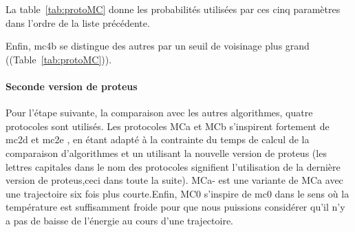La table~\ref{tab:protoMC} donne les probabilités utilisées par ces cinq paramètres dans l'ordre de la liste précédente. 

 Enfin, mc4b se distingue des autres par un seuil de voisinage plus grand ((Table~\ref{tab:protoMC})).


\paragraph{Seconde version de proteus}
Pour l'étape suivante, la comparaison avec les autres algorithmes, quatre protocoles sont utilisés. Les protocoles MCa et MCb s'inspirent fortement de mc2d et mc2e , en étant adapté à la contrainte du temps de calcul de la comparaison d'algorithmes et un utilisant la nouvelle version de proteus (les lettres capitales dans le nom des protocoles signifient l'utilisation de la dernière version de proteus,ceci dans toute la suite). MCa- est une variante de MCa avec une trajectoire six fois plus courte.Enfin, MC0 s'inspire de mc0 dans le sens où la température est suffisamment froide pour que nous puissions considérer qu'il n'y a pas de baisse de l'énergie au cours d'une trajectoire.
  

